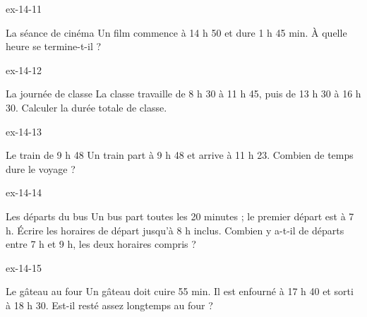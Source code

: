 \begin{blocLivre}{ex-14-11}\begin{exercice}[3]{La séance de cinéma}
Un film commence à 14 h 50 et dure 1 h 45 min. À quelle heure se termine-t-il ?
\end{exercice}\end{blocLivre}
\begin{blocLivre}{ex-14-12}\begin{exercice}[3]{La journée de classe}
La classe travaille de 8 h 30 à 11 h 45, puis de 13 h 30 à 16 h 30. Calculer la durée totale de classe.
\label{fig-ex-14-12}
\end{exercice}\end{blocLivre}
\begin{blocLivre}{ex-14-13}\begin{exercice}[3]{Le train de 9 h 48}
Un train part à 9 h 48 et arrive à 11 h 23. Combien de temps dure le voyage ?
\end{exercice}\end{blocLivre}
\begin{blocLivre}{ex-14-14}\begin{exercice}[3]{Les départs du bus}
Un bus part toutes les 20 minutes ; le premier départ est à 7 h. Écrire les horaires de départ jusqu’à 8 h inclus. Combien y a-t-il de départs entre 7 h et 9 h, les deux horaires compris ?
\end{exercice}\end{blocLivre}
\begin{blocLivre}{ex-14-15}\begin{exercice}[3]{Le gâteau au four}
Un gâteau doit cuire 55 min. Il est enfourné à 17 h 40 et sorti à 18 h 30. Est-il resté assez longtemps au four ?
\end{exercice}\end{blocLivre}

\clearpage
